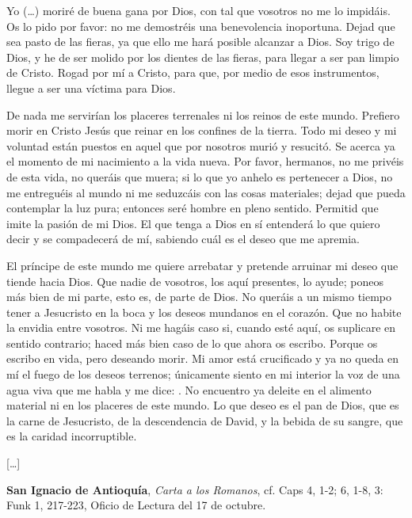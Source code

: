 \begin{patercite}
	Yo (\ldots) moriré de buena gana por Dios, con tal que vosotros no me lo impidáis. Os lo pido por favor: no me demostréis una benevolencia inoportuna. Dejad que sea pasto de las fieras, ya que ello me hará posible alcanzar a Dios. Soy trigo de Dios, y he de ser molido por los dientes de las fieras, para llegar a ser pan limpio de Cristo. Rogad por mí a Cristo, para que, por medio de esos instrumentos, llegue a ser una víctima para Dios.
	
	De nada me servirían los placeres terrenales ni los reinos de este mundo. Prefiero morir en Cristo Jesús que reinar en los confines de la tierra. Todo mi deseo y mi voluntad están puestos en aquel que por nosotros murió y resucitó. Se acerca ya el momento de mi nacimiento a la vida nueva. Por favor, hermanos, no me privéis de esta vida, no queráis que muera; si lo que yo anhelo es pertenecer a Dios, no me entreguéis al mundo ni me seduzcáis con las cosas materiales; dejad que pueda contemplar la luz pura; entonces seré hombre en pleno sentido. Permitid que imite la pasión de mi Dios. El que tenga a Dios en sí entenderá lo que quiero decir y se compadecerá de mí, sabiendo cuál es el deseo que me apremia.
	
	El príncipe de este mundo me quiere arrebatar y pretende arruinar mi deseo que tiende hacia Dios. Que nadie de vosotros, los aquí presentes, lo ayude; poneos más bien de mi parte, esto es, de parte de Dios. No queráis a un mismo tiempo tener a Jesucristo en la boca y los deseos mundanos en el corazón. Que no habite la envidia entre vosotros. Ni me hagáis caso si, cuando esté aquí, os suplicare en sentido contrario; haced más bien caso de lo que ahora os escribo. Porque os escribo en vida, pero deseando morir. Mi amor está crucificado y ya no queda en mí el fuego de los deseos terrenos; únicamente siento en mi interior la voz de una agua viva que me habla y me dice: . No encuentro ya deleite en el alimento material ni en los placeres de este mundo. Lo que deseo es el pan de Dios, que es la carne de Jesucristo, de la descendencia de David, y la bebida de su sangre, que es la caridad incorruptible.
	
	[\ldots]
	
	\textbf{San Ignacio de Antioquía}, \textit{Carta a los Romanos}, cf. Caps 4, 1-2; 6, 1-8, 3: Funk 1, 217-223, Oficio de Lectura del 17 de octubre.
\end{patercite}




